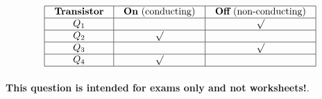 $$\vbox{\offinterlineskip
\halign{\strut
\vrule \quad\hfil # \ \hfil & 
\vrule \quad\hfil # \ \hfil & 
\vrule \quad\hfil # \ \hfil \vrule \cr
\noalign{\hrule}
%
{\bf Transistor} & {\bf On} (conducting) & {\bf Off} (non-conducting) \cr
%
\noalign{\hrule}
%
$Q_1$ &  & $\surd$ \cr
%
\noalign{\hrule}
%
$Q_2$ & $\surd$ &  \cr
%
\noalign{\hrule}
%
$Q_3$ &  & $\surd$ \cr
%
\noalign{\hrule}
%
$Q_4$ & $\surd$ &  \cr
%
\noalign{\hrule}
} %
}$$ %







{\bf This question is intended for exams only and not worksheets!}.


